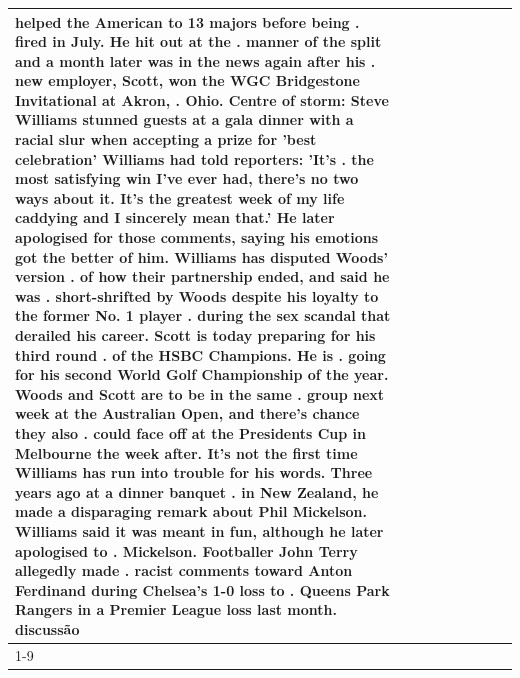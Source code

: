 \begin{table}[H]
\begin{tabular}{lllrlllll}
helped the American to 13 majors before being . fired in July. He hit out at the . manner of the split and a month later was in the news again after his . new employer, Scott, won the WGC Bridgestone Invitational at Akron, . Ohio. Centre of storm: Steve Williams stunned guests at a gala dinner with a racial slur when accepting a prize for 'best celebration' Williams had told reporters: 'It's . the most satisfying win I've ever had, there's no two ways about it. It's the greatest week of my life caddying and I sincerely mean that.' He later apologised for those comments, saying his emotions got the better of him. Williams has disputed Woods' version . of how their partnership ended, and said he was . short-shrifted by Woods despite his loyalty to the former No. 1 player . during the sex scandal that derailed his career. Scott is today preparing for his third round . of the HSBC Champions. He is . going for his second World Golf Championship of the year. Woods and Scott are to be in the same . group next week at the Australian Open, and there's chance they also . could face off at the Presidents Cup in Melbourne the week after. It's not the first time Williams has run into trouble for his words. Three years ago at a dinner banquet . in New Zealand, he made a disparaging remark about Phil Mickelson. Williams said it was meant in fun, although he later apologised to . Mickelson. Footballer John Terry allegedly made . racist comments toward Anton Ferdinand during Chelsea's 1-0 loss to . Queens Park Rangers in a Premier League loss last month. discussão \\
\cline{1-9}

\end{tabular}
\end{table}
